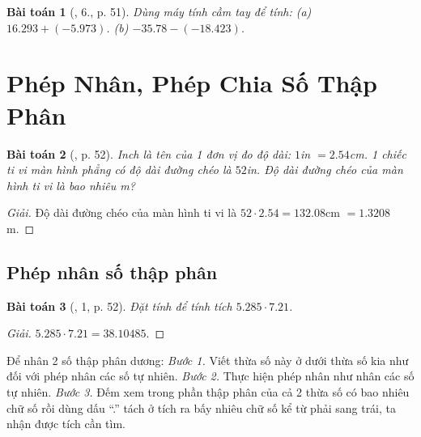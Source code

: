 \documentclass{article}
\newtheorem{baitoan}{Bài toán}
\begin{document}
\begin{baitoan}[\cite{SGK_Toan_6_Canh_Dieu_tap_2}, 6., p. 51]
	Dùng máy tính cầm tay để tính: (a) $16.293 + (-5.973)$. (b) $-35.78 -(-18.423)$.
\end{baitoan}


\section{Phép Nhân, Phép Chia Số Thập Phân}

\begin{baitoan}[\cite{SGK_Toan_6_Canh_Dieu_tap_2}, p. 52]
	Inch là tên của 1 đơn vị đo độ dài: $1$\emph{in} $= 2.54$\emph{cm}. 1 chiếc ti vi màn hình phẳng có độ dài đường chéo là $52$\emph{in}. Độ dài đường chéo của màn hình ti vi là bao nhiêu \emph{m}?
\end{baitoan}

\begin{proof}[Giải]
	Độ dài đường chéo của màn hình ti vi là $52\cdot2.54 = 132.08$cm $= 1.3208$m.
\end{proof}

\subsection{Phép nhân số thập phân}

\begin{baitoan}[\cite{SGK_Toan_6_Canh_Dieu_tap_2}, 1, p. 52]
	Đặt tính để tính tích $5.285\cdot7.21$.
\end{baitoan}

\begin{proof}[Giải]
	$5.285\cdot7.21 = 38.10485$.
\end{proof}
Để nhân 2 số thập phân dương: \textit{Bước 1.} Viết thừa số này ở dưới thừa số kia như đối với phép nhân các số tự nhiên. \textit{Bước 2.} Thực hiện phép nhân như nhân các số tự nhiên. \textit{Bước 3.} Đếm xem trong phần thập phân của cả 2 thừa số có bao nhiêu chữ số rồi dùng dấu ``.'' tách ở tích ra bấy nhiêu chữ số kể từ phải sang trái, ta nhận được tích cần tìm.
\end{document}
